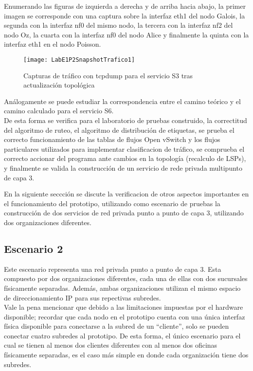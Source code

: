 Enumerando las figuras de izquierda a derecha y de arriba hacia abajo, la primer imagen se corresponde con una captura sobre la interfaz eth1 del nodo Galois, la segunda con la interfaz nf0 del mismo nodo, la tercera con la interfaz nf2 del nodo Oz, la cuarta con la interfaz nf0 del nodo Alice y finalmente la quinta con la interfaz eth1 en el nodo Poisson.

\newpage
\begin{figure}[ht!] 
\centering    
\texttt{[image: LabE1P2SnapshotTrafico1]}
\caption[Tabla de flujos ovs - Oz]{Capturas de tr\'afico con tcpdump para el servicio S3 tras actualización topol\'ogica}
\label{fig:LabE1P1CapsTraf3}
\end{figure}

Análogamente se puede estudiar la correspondencia entre el camino te\'orico y el camino calculado para el servicio S6.\\
 
De esta forma se verifica para el laboratorio de pruebas construido, la correctitud del algoritmo de ruteo, el algoritmo de distribución de etiquetas, se prueba el correcto funcionamiento de las tablas de flujos Open vSwitch y los flujos particulares utilizados para implementar clasificacion de tr\'afico, se comprueba el correcto accionar del programa ante cambios en la topolog\'ia (recalculo de LSPs), y finalmente se valida la construcción de un servicio de rede privada multipunto de capa 3.

En la siguiente seccci\'on se discute la verificacion de otros aspectos importantes en el funcionamiento del prototipo, utilizando como escenario de pruebas la construcci\'on de dos servicios de red privada punto a punto de capa 3, utilizando dos organizaciones diferentes.   

\subsection{Escenario 2}

Este escenario representa una red privada punto a punto de capa 3. Esta compuesto por dos organizaciones diferentes, cada una de ellas con dos sucursales f\'isicamente separadas. Adem\'as, ambas organizaciones utilizan el mismo espacio de direccionamiento IP para sus repectivas subredes.\\

Vale la pena mencionar que debido a las limitaciones impuestas por el hardware disponible; recordar que cada nodo en el prototipo cuenta con una \'unica interfaz f\'isica disponible para conectarse a la subred de un “cliente”, solo se pueden conectar cuatro subredes al prototipo. De esta forma, el \'unico  escenario para el cual se tienen al menos dos clientes diferentes con al menos dos oficinas físicamente separadas, es el caso m\'as simple en donde cada organización tiene dos subredes. 

